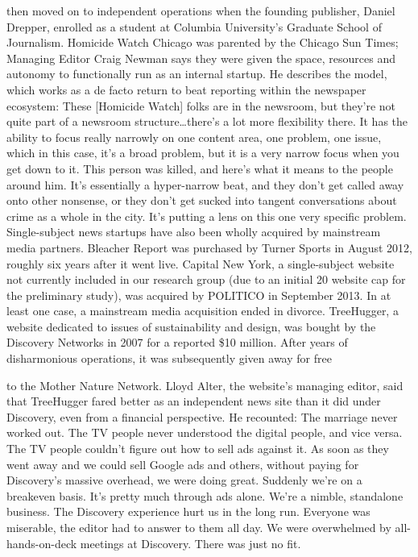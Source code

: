 then moved on to independent operations when the founding publisher,
Daniel Drepper, enrolled as a student at Columbia University’s Graduate
School of Journalism.
Homicide Watch Chicago was parented by the Chicago Sun Times; Managing
Editor Craig Newman says they were given the space, resources
and autonomy to functionally run as an internal startup. He describes the
model, which works as a de facto return to beat reporting within the newspaper
ecosystem:
These [Homicide Watch] folks are in the newsroom, but they’re not
quite part of a newsroom structure…there’s a lot more flexibility
there. It has the ability to focus really narrowly on one content area,
one problem, one issue, which in this case, it’s a broad problem, but
it is a very narrow focus when you get down to it. This person was
killed, and here’s what it means to the people around him.
It’s essentially a hyper-narrow beat, and they don’t get called away
onto other nonsense, or they don’t get sucked into tangent conversations
about crime as a whole in the city. It’s putting a lens on this one
very specific problem.
Single-subject news startups have also been wholly acquired by mainstream
media partners. Bleacher Report was purchased by Turner Sports in August
2012, roughly six years after it went live. Capital New York, a single-subject
website not currently included in our research group (due to an initial 20
website cap for the preliminary study), was acquired by POLITICO in September
2013.
In at least one case, a mainstream media acquisition ended in divorce.
TreeHugger, a website dedicated to issues of sustainability and design, was
bought by the Discovery Networks in 2007 for a reported \$10 million. After
years of disharmonious operations, it was subsequently given away for free

to the Mother Nature Network. Lloyd Alter, the website’s managing editor,
said that TreeHugger fared better as an independent news site than it did
under Discovery, even from a financial perspective. He recounted:
The marriage never worked out. The TV people never understood
the digital people, and vice versa. The TV people couldn’t figure
out how to sell ads against it. As soon as they went away and we
could sell Google ads and others, without paying for Discovery’s
massive overhead, we were doing great. Suddenly we’re on a breakeven
basis. It’s pretty much through ads alone. We’re a nimble,
standalone business.
The Discovery experience hurt us in the long run. Everyone was
miserable, the editor had to answer to them all day. We were overwhelmed
by all-hands-on-deck meetings at Discovery. There was
just no fit.


